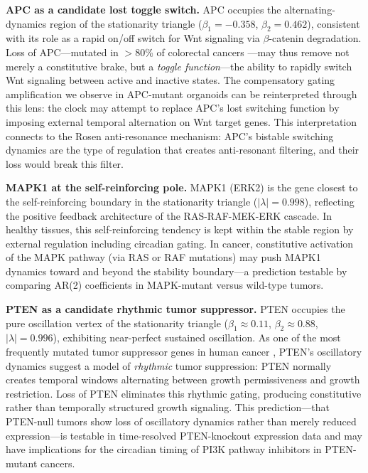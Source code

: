 \documentclass[11pt,letterpaper]{article}
\begin{document}
\textbf{APC as a candidate lost toggle switch.} APC occupies the alternating-dynamics region of the stationarity triangle ($\beta_1 = -0.358$, $\beta_2 = 0.462$), consistent with its role as a rapid on/off switch for Wnt signaling via $\beta$-catenin degradation. Loss of APC---mutated in $>$80\% of colorectal cancers \citep{fodde2002}---may thus remove not merely a constitutive brake, but a \textit{toggle function}---the ability to rapidly switch Wnt signaling between active and inactive states. The compensatory gating amplification we observe in APC-mutant organoids can be reinterpreted through this lens: the clock may attempt to replace APC's lost switching function by imposing external temporal alternation on Wnt target genes. This interpretation connects to the Rosen anti-resonance mechanism: APC's bistable switching dynamics are the type of regulation that creates anti-resonant filtering, and their loss would break this filter.

\textbf{MAPK1 at the self-reinforcing pole.} MAPK1 (ERK2) is the gene closest to the self-reinforcing boundary in the stationarity triangle ($|\lambda| = 0.998$), reflecting the positive feedback architecture of the RAS-RAF-MEK-ERK cascade. In healthy tissues, this self-reinforcing tendency is kept within the stable region by external regulation including circadian gating. In cancer, constitutive activation of the MAPK pathway (via RAS or RAF mutations) may push MAPK1 dynamics toward and beyond the stability boundary---a prediction testable by comparing AR(2) coefficients in MAPK-mutant versus wild-type tumors.

\textbf{PTEN as a candidate rhythmic tumor suppressor.} PTEN occupies the pure oscillation vertex of the stationarity triangle ($\beta_1 \approx 0.11$, $\beta_2 \approx 0.88$, $|\lambda| = 0.996$), exhibiting near-perfect sustained oscillation. As one of the most frequently mutated tumor suppressor genes in human cancer \citep{chalhoub2009}, PTEN's oscillatory dynamics suggest a model of \textit{rhythmic} tumor suppression: PTEN normally creates temporal windows alternating between growth permissiveness and growth restriction. Loss of PTEN eliminates this rhythmic gating, producing constitutive rather than temporally structured growth signaling. This prediction---that PTEN-null tumors show loss of oscillatory dynamics rather than merely reduced expression---is testable in time-resolved PTEN-knockout expression data and may have implications for the circadian timing of PI3K pathway inhibitors in PTEN-mutant cancers.
\end{document}

